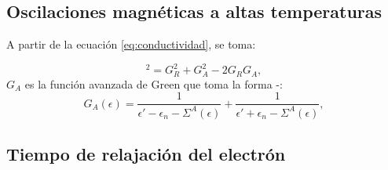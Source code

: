 \subsection{Oscilaciones magnéticas a altas temperaturas}

\begin{frame}
  A partir de la ecuación \ref{eq:conductividad}, se toma:

  \begin{equation}
    [2\textbf{Im}G^{R}(\epsilon)]^2 = G_{R}^{2}+G_{A}^{2}-2G_{R}G_{A},
    \label{2ImGr2}
  \end{equation}
  $G_A$ es la función avanzada de Green que toma la forma \cite{Vega2016}-\cite{Salazar2016}:
  \begin{equation}
    G_A(\epsilon) = \frac{1}{\epsilon'-\epsilon_n-\Sigma^A(\epsilon)} + \frac{1}{\epsilon'+\epsilon_n-\Sigma^A(\epsilon)},
   \end{equation}
\end{frame}

\begin{frame}
\end{frame}

\begin{frame}
\end{frame}

\begin{frame}
\end{frame}

\begin{frame}
\end{frame}

\subsection{Tiempo de relajación del electrón}

\begin{frame}
\end{frame}

\begin{frame}
\end{frame}

\begin{frame}
\end{frame}

\begin{frame}
\end{frame}

\begin{frame}
\end{frame}
